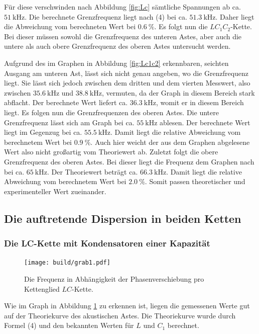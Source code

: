 	 Für diese verschwinden nach Abbildung \ref{fig:Lc} sämtliche Spannungen ab ca.
	  $\SI{51}{\kilo\hertz}$. Die berechnete Grenzfrequenz liegt nach (4) bei
		 ca. $\SI{51,3}{\kilo\hertz}$. Daher liegt die Abweichung vom berechneten Wert bei $\SI{0.6}{\percent}$. Es folgt nun die $LC_1C_2$-Kette. Bei dieser müssen
			 sowohl die Grenzfrequenz des unteren Astes, aber auch die untere als auch obere Grenzfrequenz des
			  oberen Astes untersucht werden.



         Aufgrund des im Graphen in Abbildung \ref{fig:Lc1c2} erkennbaren, seichten
				Ausgang am unteren Ast, lässt sich nicht genau angeben, wo die
				 Grenzfrequenz liegt. Sie lässt sich jedoch zwischen dem dritten
				  und dem vierten Messwert, also zwischen $\SI{35,6}{\kilo\hertz}$ und
					$\SI{38,8}{\kilo\hertz}$, vermuten, da der Graph in diesem Bereich
					 stark abflacht. Der berechnete Wert liefert ca. $\SI{36,3}{\kilo\hertz}$,
					  womit er in diesem Bereich liegt.
						 Es folgen nun die Grenzfrequenzen des oberen Astes. Die
						  untere Grenzfrequenz lässt sich am Graph bei ca. $\SI{55}{\kilo\hertz}$
							ablesen. Der berechnete Wert liegt im Gegenzug bei
							 ca. $\SI{55,5}{\kilo\hertz}$. Damit liegt die relative Abweichung vom berechnetem Wert bei $\SI{0.9}{\percent}$. Auch hier weicht der aus dem Graphen abgelesene Wert also nicht
							 großartig vom Theoriewert ab. Zuletzt folgt die obere Grenzfrequenz
							 des oberen Astes. Bei dieser liegt die Frequenz dem Graphen nach bei ca.
							  $\SI{65}{\kilo\hertz}$. Der Theoriewert beträgt ca. $\SI{66,3}{\kilo\hertz}$. Damit liegt die relative Abweichung vom berechnetem Wert bei $\SI{2.0}{\percent}$.
							Somit passen theoretischer und experimenteller Wert zueinander.


\subsection{Die auftretende Dispersion in beiden Ketten}
\subsubsection{Die LC-Kette mit Kondensatoren einer Kapazität}
\begin{figure}[H]
	\centering
	\caption{Die Frequenz in Abhängigkeit der Phasenverschiebung pro Kettenglied $LC$-Kette.}
	\texttt{[image: build/grab1.pdf]}
	\label{fig:grab1}
\end{figure}

Wie im Graph in Abbildung \ref{fig:grab1} zu erkennen ist, liegen die gemessenen Werte gut auf der Theoriekurve des akustischen Astes. Die Theoriekurve wurde durch Formel (4) und den bekannten Werten für $L$ und $C_1$ berechnet.


